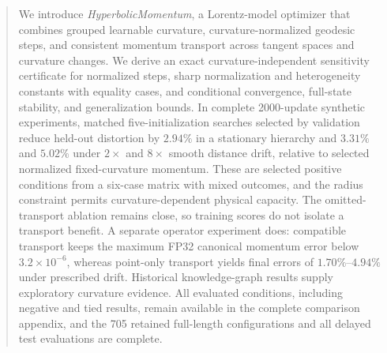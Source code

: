\documentclass{article}
\begin{document}
\printAffiliationsAndNotice{}

\begin{abstract}
We introduce \emph{HyperbolicMomentum}, a Lorentz-model optimizer that combines grouped learnable curvature, curvature-normalized geodesic steps, and consistent momentum transport across tangent spaces and curvature changes. We derive an exact curvature-independent sensitivity certificate for normalized steps, sharp normalization and heterogeneity constants with equality cases, and conditional convergence, full-state stability, and generalization bounds. In complete 2000-update synthetic experiments, matched five-initialization searches selected by validation reduce held-out distortion by $2.94\%$ in a stationary hierarchy and $3.31\%$ and $5.02\%$ under $2\times$ and $8\times$ smooth distance drift, relative to selected normalized fixed-curvature momentum. These are selected positive conditions from a six-case matrix with mixed outcomes, and the radius constraint permits curvature-dependent physical capacity. The omitted-transport ablation remains close, so training scores do not isolate a transport benefit. A separate operator experiment does: compatible transport keeps the maximum FP32 canonical momentum error below $3.2\times10^{-6}$, whereas point-only transport yields final errors of $1.70\%$--$4.94\%$ under prescribed drift. Historical knowledge-graph results supply exploratory curvature evidence. All evaluated conditions, including negative and tied results, remain available in the complete comparison appendix, and the 705 retained full-length configurations and all delayed test evaluations are complete.
\end{abstract}












\clearpage
\appendix
\onecolumn



\FloatBarrier
\clearpage

\end{document}
